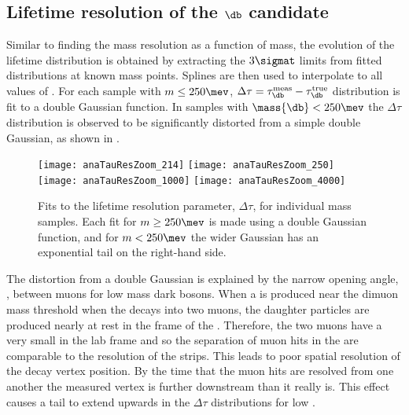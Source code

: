 

\subsection[Lifetime resolution of the \db candidate]
{Lifetime resolution of the $\boldsymbol{\db}$ candidate}
Similar to finding the mass resolution as a function of mass, the evolution of the lifetime
distribution is obtained by extracting the $3\sigmat$ limits from fitted distributions at known \db
mass points.
Splines are then used to interpolate to all values of \mass{\db}.
For each \btokstrdb sample with $m\leq250\mev$,
$\Delta\tau=\tau^\mathrm{meas}_{\db}-\tau^\mathrm{true}_{\db}$ distribution is fit to a double
Gaussian function.
In samples with $\mass{\db}<250\mev$ the $\Delta\tau$ distribution is observed to be significantly
distorted from a simple double Gaussian, as shown in .

\begin{figure}
  \begin{center}
    \texttt{[image: anaTauResZoom\_214]}
    \texttt{[image: anaTauResZoom\_250]}
    \texttt{[image: anaTauResZoom\_1000]}
    \texttt{[image: anaTauResZoom\_4000]}
  \end{center}
  \caption[Fits to the lifetime resolution for simulated ]
  {
    Fits to the lifetime resolution parameter, $\Delta\tau$, for individual mass samples.
    Each fit for $m\geq250\mev$ is made using a double Gaussian function, and for $m<250\mev$ the
    wider Gaussian has an exponential tail on the right-hand side.
  }
  \label{fig:taures:zoom}
\end{figure}

The distortion from a double Gaussian is explained by the narrow opening angle, \thetaopen, between
muons for low mass dark bosons.
When a \db is produced near the dimuon mass threshold when the \db decays into two muons, the
daughter particles are produced nearly at rest in the frame of the \db.
Therefore, the two muons have a very small \thetaopen in the lab frame
and so the separation of muon hits in the \velo are
comparable to the resolution of the \velo strips.
This leads to poor spatial resolution of the \db decay vertex position.
By the time that the muon hits are resolved from one another the measured vertex is further
downstream than it really is.
This effect causes a tail to extend upwards in the $\Delta\tau$ distributions for low \mdb.

